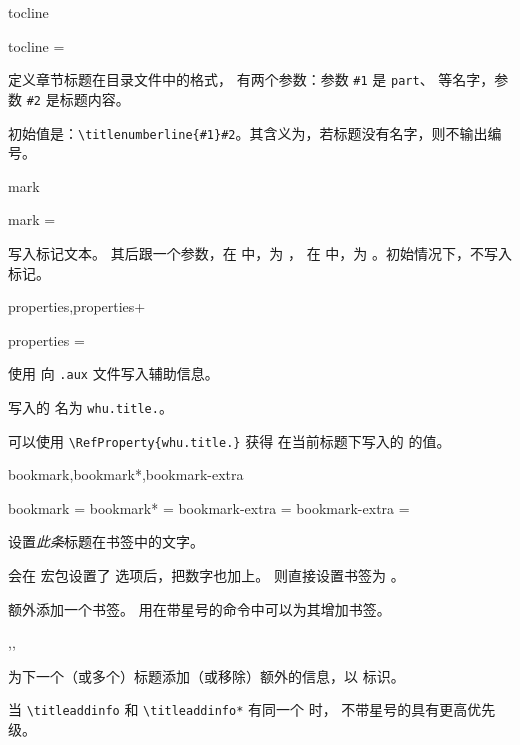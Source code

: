 \documentclass{whudoc}
\begin{document}
\begin{keyval}[path=title/...]{tocline}
  \begin{syntax}
    tocline = 
  \end{syntax}
定义章节标题在目录文件中的格式， 有两个参数：参数
\verb|#1| 是 \texttt{part}、 等名字，参数 \verb|#2| 是标题内容。

初始值是：\verb|\titlenumberline{#1}#2|。其含义为，若标题没有名字，则不输出编号。
\end{keyval}

\begin{keyval}[path=title/...]{mark}
  \begin{syntax}
    mark = 
  \end{syntax}
写入标记文本。 其后跟一个参数，在  中，为 ，
在  中，为 。初始情况下，不写入标记。
\end{keyval}

\begin{keyval}[path=title/...]{properties,properties+}
  \begin{syntax}
    properties = 
  \end{syntax}
使用  向 \texttt{.aux} 文件写入辅助信息。

写入的  名为 \texttt{whu.title.}。

可以使用 \verb|\RefProperty{whu.title.|\verb|}| 获得
在当前标题下写入的  的值。
\end{keyval}

\begin{keyval}[path=title/...]{bookmark,bookmark*,bookmark-extra}
  \begin{syntax}
    bookmark  = 
    bookmark* = 
    bookmark-extra = 
    bookmark-extra =  
  \end{syntax}
设置\emph{此条}标题在书签中的文字。

 会在  宏包设置了  选项后，把数字也加上。
\linebreak{} 则直接设置书签为 。

 额外添加一个书签。
用在带星号的命令中可以为其增加书签。
\end{keyval}

\begin{function}{\titleaddinfo,\titleremoveinfo,\titleremoveallinfo}
  \begin{syntax}
    \V\titleaddinfo   {} 
    \V\titleaddinfo *  
    \V\titleremoveinfo  {} 
    \V\titleremoveinfo *  
    \V\titleremoveallinfo 
    \V\titleremoveallinfo *
  \end{syntax}
为下一个（或多个）标题添加（或移除）额外的信息，以  标识。

当 \verb|\titleaddinfo| 和 \verb|\titleaddinfo*| 有同一个  时，
不带星号的具有更高优先级。
\end{function}
\end{document}
